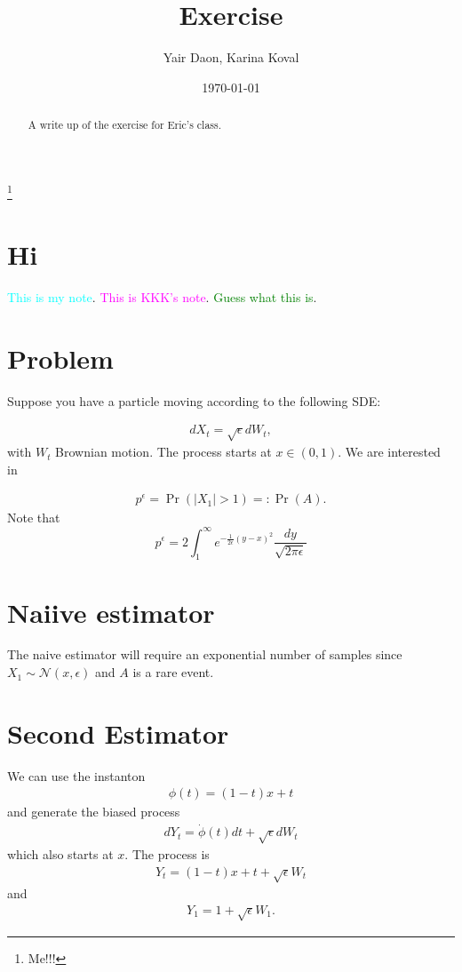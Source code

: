 \documentclass[11pt]{amsart}
\newcommand{\N}{\mathcal{N}}
\newcommand{\want}{p^{\epsilon}}
\newcommand{\noise}{\sqrt{\epsilon}}
\newcommand{\kknote}[1]{{\textcolor{magenta}{#1}}}
\newcommand{\ydnote}[1]{{\textcolor{cyan}{#1}}}
\newcommand{\dmnote}[1]{{\textcolor{green}{#1}}}
\begin{document}
\title{Exercise}

\author{Yair Daon, Karina Koval}
\address{Courant Institute of Mathematical Sciences \\ New York University \\ 251 Mercer St., New York, NY}


\thanks{Me!!!} 
\date{\today}

\begin{abstract}
  A write up of the exercise for Eric's class.
\end{abstract}


\maketitle


\section{Hi}
\ydnote{This is my note}. \kknote{This is KKK's note}. \dmnote{Guess what this is}.
\section{Problem}
Suppose you have a particle moving according to the following SDE:

\begin{align*}
  dX_t = \noise dW_t,
\end{align*}
with $W_t$ Brownian motion. The process starts at $x \in (0,1)$. We are
interested in 

\begin{align*}
  \want = \Pr( |X_1| > 1 ) =:\Pr(A). 
\end{align*}
Note that
\begin{equation}
\want = 2 \int_{1}^{\infty} e^{-\frac{1}{2\epsilon}(y-x)^2} \frac{dy}{\sqrt{2\pi\epsilon}} 
\end{equation}

\section{Naiive estimator}
The naive estimator will require an exponential number of samples since 
$X_1 \sim \N( x, \epsilon )$ and $A$ is a rare event.

\section{Second Estimator}
We can use the instanton 
\begin{align*}
  \phi(t) = (1-t)x + t
\end{align*}
and generate the biased process
\begin{align*}
dY_t = \dot{\phi}(t)dt + \noise dW_t
\end{align*}
which also starts at $x$. The process is
\begin{align*}
  Y_t = (1-t)x + t + \noise W_t
\end{align*}
and
\begin{align*}
  Y_1 = 1 + \noise W_1.
\end{align*}
\end{document}
